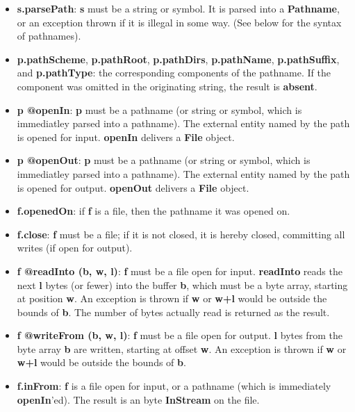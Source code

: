 \documentclass{report}
\begin{document}
\begin{itemize}\item {\bf s.parsePath}: {\bf s} must be a string or symbol. It is parsed into a {\bf Pathname},
or an exception thrown if it is illegal in some way. (See below for the syntax
of pathnames).

\item {\bf p.pathScheme}, {\bf p.pathRoot}, {\bf p.pathDirs}, {\bf p.pathName}, {\bf p.pathSuffix}, and
{\bf p.pathType}: the corresponding components of the pathname. If the component
was omitted in the originating string, the result is {\bf absent}.

\item {\bf p @openIn}: {\bf p} must be a pathname (or string or symbol, which is immediatley
parsed into a pathname). The external entity named by the path is opened for
input. {\bf openIn} delivers a {\bf File} object.

\item {\bf p @openOut}: {\bf p} must be a pathname (or string or symbol, which is immediatley
parsed into a pathname). The external entity named by the path is opened for
output. {\bf openOut} delivers a {\bf File} object.

\item {\bf f.openedOn}: if {\bf f} is a file, then the pathname it was opened on.

\item {\bf f.close}: {\bf f} must be a file; if it is not closed, it is hereby closed,
committing all writes (if open for output).

\item {\bf f @readInto (b, w, l)}: {\bf f} must be a file open for input. {\bf readInto} reads
the next {\bf l} bytes (or fewer) into the buffer {\bf b}, which must be a byte array,
starting at position {\bf w}. An exception is thrown if {\bf w} or {\bf w+l} would be
outside the bounds of {\bf b}. The number of bytes actually read is returned as
the result.

\item {\bf f @writeFrom (b, w, l)}: {\bf f} must be a file open for output. {\bf l} bytes from
the byte array {\bf b} are written, starting at offset {\bf w}. An exception is thrown
if {\bf w} or {\bf w+l} would be outside the bounds of {\bf b}.

\item {\bf f.inFrom}: {\bf f} is a file open for input, or a pathname (which is immediately
{\bf openIn}'ed). The result is an byte {\bf InStream} on the file.


\end{itemize}
\end{document}
